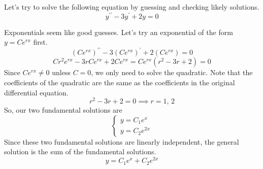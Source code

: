 \begin{example}
	Let's try to solve the following equation by guessing and checking likely solutions.
	\begin{equation*}
		y^{\prime\prime} - 3y^\prime + 2y = 0
	\end{equation*}
\end{example}
\noindent
Exponentials seem like good guesses. Let's try an exponential of the form $y = Ce^{rx}$ first.
\begin{equation*}
	\left(Ce^{rx}\right)^{\prime\prime} - 3\left(Ce^{rx}\right)^\prime + 2\left(Ce^{rx}\right) =  0
\end{equation*}
\begin{equation*}
	Cr^2e^{rx} - 3rCe^{rx} + 2Ce^{rx} = Ce^{rx}\left(r^2 - 3r + 2\right) = 0
\end{equation*}
Since $Ce^{rx} \neq 0$ unless $C = 0$, we only need to solve the quadratic. Note that the coefficients of the quadratic are the same as the coefficients in the original differential equation.
\begin{equation*}
	r^2 - 3r + 2 = 0 \implies r = 1 \text{, } 2
\end{equation*}
So, our two fundamental solutions are
\begin{equation*}
	\begin{cases}
		y = C_1e^{x} \\
		y = C_2e^{2x}
	\end{cases}
\end{equation*}
Since these two fundamental solutions are linearly independent, the general solution is the sum of the fundamental solutions.
\begin{equation*}
	y = C_1e^{x} + C_2e^{2x}
\end{equation*}